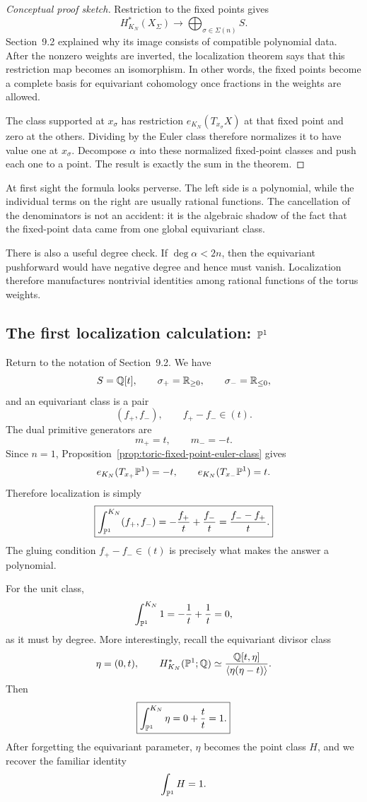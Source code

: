 \begin{proof}[Conceptual proof sketch]
Restriction to the fixed points gives
\[
H_{K_N}^*(X_\Sigma)
\longrightarrow
\bigoplus_{\sigma\in\Sigma(n)}S.
\]
Section~9.2 explained why its image consists of compatible polynomial
data.  After the nonzero weights are inverted, the localization theorem
says that this restriction map becomes an isomorphism.  In other
words, the fixed points become a complete basis for equivariant
cohomology once fractions in the weights are allowed.

The class supported at \(x_\sigma\) has restriction
\(e_{K_N}(T_{x_\sigma}X)\) at that fixed point and zero at the others.
Dividing by the Euler class therefore normalizes it to have value one
at \(x_\sigma\).  Decompose \(\alpha\) into these normalized fixed-point
classes and push each one to a point.  The result is exactly the sum in
the theorem.
\end{proof}

At first sight the formula looks perverse.  The left side is a
polynomial, while the individual terms on the right are usually
rational functions.  The cancellation of the denominators is not an
accident: it is the algebraic shadow of the fact that the fixed-point
data came from one global equivariant class.

There is also a useful degree check.  If \(\deg\alpha<2n\), then the
equivariant pushforward would have negative degree and hence must
vanish.  Localization therefore manufactures nontrivial identities
among rational functions of the torus weights.

\subsection{The first localization calculation:
\texorpdfstring{\(\mathbb{P}^1\)}{P1}}

Return to the notation of Section~9.2.  We have
\[
S=\mathbb{Q}[t],
\qquad
\sigma_+=\mathbb{R}_{\ge0},
\qquad
\sigma_-=\mathbb{R}_{\le0},
\]
and an equivariant class is a pair
\[
(f_+,f_-),
\qquad
f_+-f_-\in(t).
\]
The dual primitive generators are
\[
m_+=t,
\qquad
m_-=-t.
\]
Since \(n=1\), Proposition~\ref{prop:toric-fixed-point-euler-class} gives
\[
e_{K_N}(T_{x_+}\mathbb{P}^1)=-t,
\qquad
e_{K_N}(T_{x_-}\mathbb{P}^1)=t.
\]
Therefore localization is simply
\[
\boxed{
\int_{\mathbb{P}^1}^{K_N}(f_+,f_-)
=
-\frac{f_+}{t}+\frac{f_-}{t}
=
\frac{f_--f_+}{t}.
}
\]
The gluing condition \(f_+-f_-\in(t)\) is precisely what makes the
answer a polynomial.

For the unit class,
\[
\int_{\mathbb{P}^1}^{K_N}1
=
-\frac1t+\frac1t
=0,
\]
as it must by degree.  More interestingly, recall the equivariant
divisor class
\[
\eta=(0,t),
\qquad
H_{K_N}^*(\mathbb{P}^1;\mathbb{Q})
\simeq
\frac{\mathbb{Q}[t,\eta]}{\langle\eta(\eta-t)\rangle}.
\]
Then
\[
\boxed{
\int_{\mathbb{P}^1}^{K_N}\eta
=
0+\frac{t}{t}
=1.
}
\]
After forgetting the equivariant parameter, \(\eta\) becomes the point
class \(H\), and we recover the familiar identity
\[
\int_{\mathbb{P}^1}H=1.
\]

